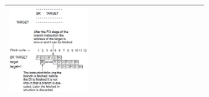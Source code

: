 \begin{longtable}{|>{\bfseries}p{}|p{}|p{}|}
						\includegraphics[width=0.45\textwidth]{./pictures/controlHazard.png}\\
				\hline
			\end{longtable}
		